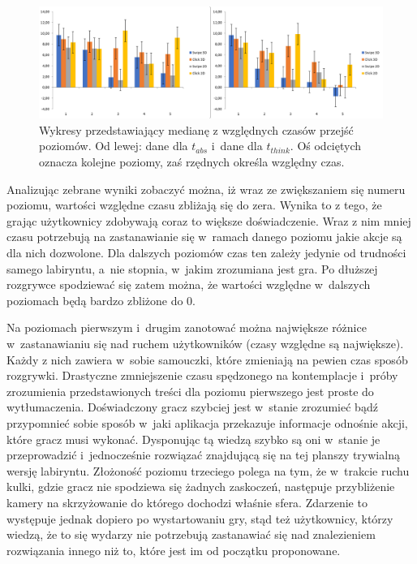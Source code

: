 \documentclass[a4paper,12pt,numbers=noenddot]{report}
\begin{document}
\begin{figure}[h!]
	\centering
  	\includegraphics[width=\linewidth]{diag/rel_median_absThinkTime.png}
	\caption{Wykresy przedstawiający medianę z względnych czasów przejść poziomów. Od lewej: dane dla $t_{abs}$ i~dane dla $t_{think}$. Oś odciętych oznacza kolejne poziomy, zaś rzędnych określa względny czas.}
	\label{fig:diag:rel:median_AbsThinkTime}
\end{figure}

Analizując zebrane wyniki zobaczyć można, iż wraz ze zwiększaniem się numeru poziomu, wartości względne czasu zbliżają się do zera. Wynika to z tego, że grając użytkownicy zdobywają coraz to większe doświadczenie. Wraz z nim mniej czasu potrzebują na zastanawianie się w~ramach danego poziomu jakie akcje są dla nich dozwolone. Dla dalszych poziomów czas ten zależy jedynie od trudności samego labiryntu, a~nie stopnia, w~jakim zrozumiana jest gra. Po dłuższej rozgrywce spodziewać się zatem można, że wartości względne w~dalszych poziomach będą bardzo zbliżone do 0.

Na poziomach pierwszym i~drugim zanotować można największe różnice w~zastanawianiu się nad ruchem użytkowników (czasy względne są największe). Każdy z nich zawiera w~sobie samouczki, które zmieniają na pewien czas sposób rozgrywki. Drastyczne zmniejszenie czasu spędzonego na kontemplacje i~próby zrozumienia przedstawionych treści dla poziomu pierwszego jest proste do wytłumaczenia. Doświadczony gracz szybciej jest w~stanie zrozumieć bądź przypomnieć sobie sposób w~jaki aplikacja przekazuje informacje odnośnie akcji, które gracz musi wykonać. Dysponując tą wiedzą szybko są oni w~stanie je przeprowadzić i~jednocześnie rozwiązać znajdującą się na tej planszy trywialną wersję labiryntu. Złożoność poziomu trzeciego polega na tym, że w~trakcie ruchu kulki, gdzie gracz nie spodziewa się żadnych zaskoczeń, następuje przybliżenie kamery na skrzyżowanie do którego dochodzi właśnie sfera. Zdarzenie to występuje jednak dopiero po wystartowaniu gry, stąd też użytkownicy, którzy wiedzą, że to się wydarzy nie potrzebują zastanawiać się nad znalezieniem rozwiązania innego niż to, które jest im od początku proponowane.\\
\end{document}
